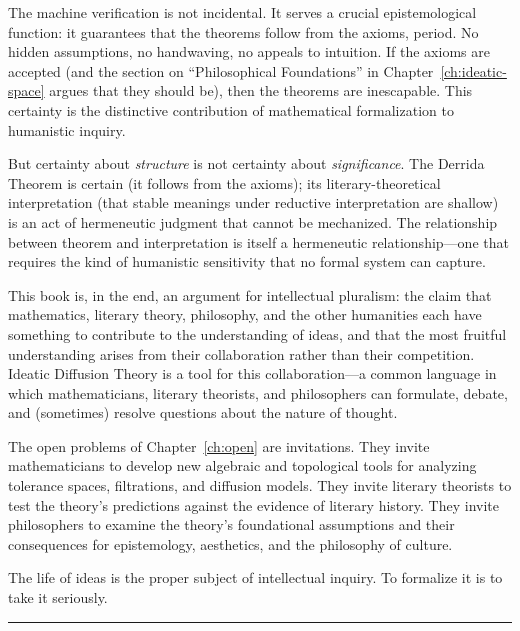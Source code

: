 \documentclass[11pt,openany]{book}
\theoremstyle{definition}
\theoremstyle{plain}
\theoremstyle{remark}
\begin{document}
The machine verification is not incidental. It serves a crucial epistemological function: it guarantees that the theorems follow from the axioms, period. No hidden assumptions, no handwaving, no appeals to intuition. If the axioms are accepted (and the section on ``Philosophical Foundations'' in Chapter~\ref{ch:ideatic-space} argues that they should be), then the theorems are inescapable. This certainty is the distinctive contribution of mathematical formalization to humanistic inquiry.

But certainty about \emph{structure} is not certainty about \emph{significance}. The Derrida Theorem is certain (it follows from the axioms); its literary-theoretical interpretation (that stable meanings under reductive interpretation are shallow) is an act of hermeneutic judgment that cannot be mechanized. The relationship between theorem and interpretation is itself a hermeneutic relationship---one that requires the kind of humanistic sensitivity that no formal system can capture.

This book is, in the end, an argument for intellectual pluralism: the claim that mathematics, literary theory, philosophy, and the other humanities each have something to contribute to the understanding of ideas, and that the most fruitful understanding arises from their collaboration rather than their competition. Ideatic Diffusion Theory is a tool for this collaboration---a common language in which mathematicians, literary theorists, and philosophers can formulate, debate, and (sometimes) resolve questions about the nature of thought.

The open problems of Chapter~\ref{ch:open} are invitations. They invite mathematicians to develop new algebraic and topological tools for analyzing tolerance spaces, filtrations, and diffusion models. They invite literary theorists to test the theory's predictions against the evidence of literary history. They invite philosophers to examine the theory's foundational assumptions and their consequences for epistemology, aesthetics, and the philosophy of culture.

The life of ideas is the proper subject of intellectual inquiry. To formalize it is to take it seriously.

\vspace{2em}
\begin{center}
\rule{0.5\textwidth}{0.4pt}
\end{center}
\vspace{2em}

\appendix
\end{document}
